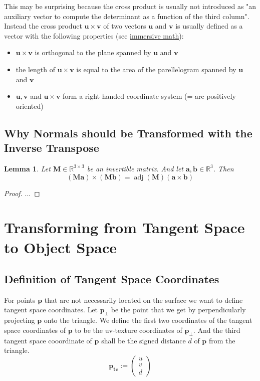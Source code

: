\documentclass{article}
\newtheorem{lemma}{Lemma}
\newcommand{\R}{\mathbb{R}}
\newcommand{\vctr}[1]{\mathbf{#1}}
\newcommand{\point}[1]{\mathbf{#1}}
\newcommand{\mat}[1]{\mathbf{#1}}
\newcommand{\colvec}[1]{\begin{pmatrix}#1\end{pmatrix}}
\DeclareMathOperator{\adj}{adj}
\begin{document}
This may be surprising because the cross product is usually not introduced as "an auxiliary vector to compute the determinant as a function of the third column". Instead the cross product \(\vctr{u} \times \vctr{v}\) of two vectors \(\vctr{u}\) and \(\vctr{v}\) is usually defined as a vector with the following properties (see \href{http://immersivemath.com/ila/ch04_vectorproduct/ch04.html#sec_vp_definition}{immersive math}):
\begin{itemize}
\item \(\vctr{u} \times \vctr{v}\) is orthogonal to the plane spanned by \(\vctr{u}\) and \(\vctr{v}\)
\item the length of \(\vctr{u} \times \vctr{v}\) is equal to the area of the parellelogram spanned by \(\vctr{u}\) and \(\vctr{v}\)
\item \(\vctr{u}, \vctr{v}\) and \(\vctr{u} \times \vctr{v}\) form a right handed coordinate system (= are positively oriented)
\end{itemize}



\subsection{Why Normals should be Transformed with the Inverse Transpose}

\begin{lemma}
Let \(\mat{M} \in \R^{3\times 3}\) be an invertible matrix. And let \(\vctr{a}, \vctr{b} \in \R^3\). Then
\[
(\mat{M}\vctr{a})\times(\mat{M}\vctr{b}) = \adj(\mat{M}) (\vctr{a} \times \vctr{b})
\]
\end{lemma}
\begin{proof}
 ...
\end{proof}


\section{Transforming from Tangent Space to Object Space}

\subsection{Definition of Tangent Space Coordinates}
For points \(\point{p}\) that are not necessarily located on the surface we want to define tangent space coordinates. Let \(\point{p_\perp}\) be the point that we get by perpendicularly projecting \(\point{p}\) onto the triangle. We define the first two coordinates of the tangent space coordinates of \(\point{p}\) to be the uv-texture coordinates of \(\point{p_\perp}\). And the third tangent space cooordinate of \(\point{p}\) shall be the signed distance \(d\) of \(\point{p}\) from the triangle.
\begin{equation*}
 \point{p_{tc}} := \colvec{u \\ v \\ d}
\end{equation*}
\end{document}
